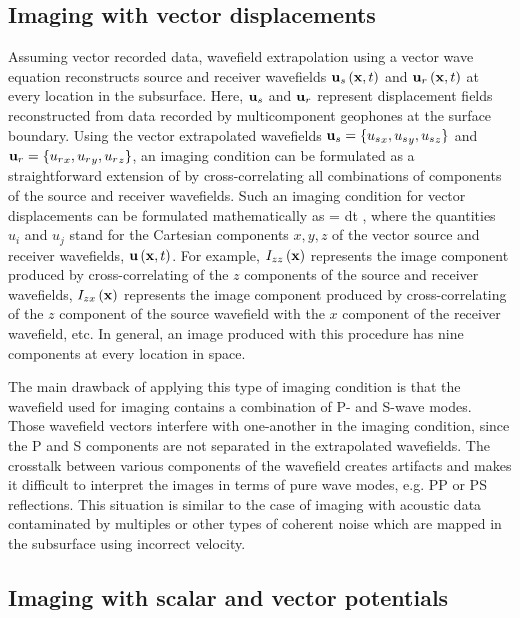 \subsection{Imaging with vector displacements}

Assuming vector recorded data, wavefield extrapolation using a vector
wave equation reconstructs source and receiver wavefields ${\mathbf u}_s\left ( {\mathbf x},t \right)$
and ${\mathbf u}_r\left ( {\mathbf x},t \right)$ at every location  in the
subsurface. Here, ${\mathbf u}_s$ and ${\mathbf u}_r$ represent displacement fields
reconstructed from data recorded by multicomponent geophones at the
surface boundary. Using the vector extrapolated wavefields
${{\mathbf u}}_s=\{{u_s}_x,{u_s}_y,{u_s}_z\}$ and
${{\mathbf u}}_r=\{{u_r}_x,{u_r}_y,{u_r}_z\}$, an imaging condition can be
formulated as a straightforward extension of  by
cross-correlating all combinations of components of the source and
receiver wavefields. Such an imaging condition for vector
displacements can be formulated mathematically as
%
\beq \label{eqn:EICij}
\ofx = \int {}\ofxt {}\ofxt dt \;,
\eeq
%
where the quantities $u_i$ and $u_j$ stand for the Cartesian
components ${x,y,z}$ of the vector source and receiver wavefields,
${\mathbf u}\left ( {\mathbf x},t \right)$. For example, ${I}_{zz}\left ( {\mathbf x} \right)$ represents the image component
produced by cross-correlating of the $z$ components of the source and
receiver wavefields,  ${I}_{zx}\left ( {\mathbf x} \right)$ represents the image component
produced by cross-correlating of the $z$ component of the source
wavefield with the $x$ component of the receiver wavefield, etc. In
general, an image produced with this procedure has nine components at
every location in space.

The main drawback of applying this type of imaging condition is that
the wavefield used for imaging contains a combination of P- and S-wave
modes. Those wavefield vectors interfere with one-another in the
imaging condition, since the P and S components are not separated in
the extrapolated wavefields. The crosstalk between various components
of the wavefield creates artifacts and makes it difficult to interpret
the images in terms of pure wave modes, e.g. PP or PS
reflections. This situation is similar to the case of imaging with
acoustic data contaminated by multiples or other types of coherent
noise which are mapped in the subsurface using  incorrect
velocity.

\subsection{Imaging with scalar and vector potentials}

